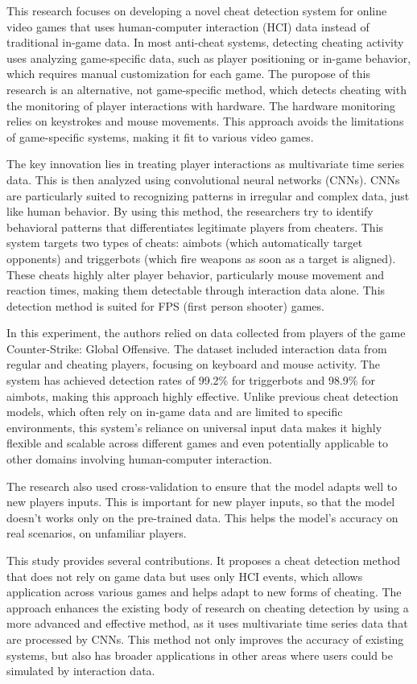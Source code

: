 This research focuses on developing a novel cheat detection system for online video games that uses human-computer interaction (HCI) data instead of traditional in-game data. In most anti-cheat systems, detecting cheating activity uses analyzing game-specific data, such as player positioning or in-game behavior, which requires manual customization for each game. The puropose of this research is an alternative, not game-specific method, which detects cheating with the monitoring of player interactions with hardware. The hardware monitoring relies on keystrokes and mouse movements. This approach avoids the limitations of game-specific systems, making it fit to various video games. 

The key innovation lies in treating player interactions as multivariate time series data. This is then analyzed using convolutional neural networks (CNNs). CNNs are particularly suited to recognizing patterns in irregular and complex data, just like human behavior. By using this method, the researchers try to identify behavioral patterns that differentiates legitimate players from cheaters. This system targets two types of cheats: aimbots (which automatically target opponents) and triggerbots (which fire weapons as soon as a target is aligned). These cheats highly alter player behavior, particularly mouse movement and reaction times, making them detectable through interaction data alone. This detection method is suited for FPS (first person shooter) games.

In this experiment, the authors relied on data collected from players of the game Counter-Strike: Global Offensive. The dataset included interaction data from regular and cheating players, focusing on keyboard and mouse activity. The system has achieved detection rates of 99.2\% for triggerbots and 98.9\% for aimbots, making this approach highly effective. Unlike previous cheat detection models, which often rely on in-game data and are limited to specific environments, this system’s reliance on universal input data makes it highly flexible and scalable across different games and even potentially applicable to other domains involving human-computer interaction.

The research also used cross-validation to ensure that the model adapts well to new players inputs. This is important for new player inputs, so that the model doesn't works only on the pre-trained data. This helps the model's accuracy on real scenarios, on unfamiliar players.

This study provides several contributions. It proposes a cheat detection method that does not rely on game data but uses only HCI events, which allows application across various games and helps adapt to new forms of cheating. The approach enhances the existing body of research on cheating detection by using a more advanced and effective method, as it uses multivariate time series data that are processed by CNNs. This method not only improves the accuracy of existing systems, but also has broader applications in other areas where users could be simulated by interaction data.

